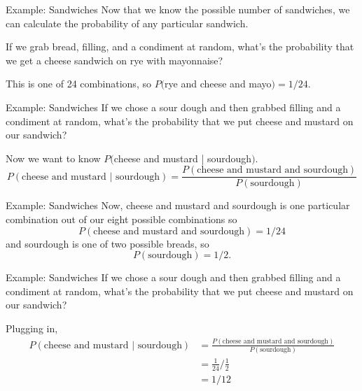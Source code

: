 \begin{frame}{Example: Sandwiches}
    Now that we know the possible number of sandwiches, we can calculate the probability of any particular sandwich.
    
    \vspace{12pt}If we grab bread, filling, and a condiment at random, what's the probability that we get a cheese sandwich on rye with mayonnaise?
    
    \vspace{12pt}This is one of 24 combinations, so $P($rye and cheese and mayo$)=1/24$.
\end{frame}

\begin{frame}{Example: Sandwiches}
    If we chose a sour dough and then grabbed filling and a condiment at random, what's the probability that we put cheese and mustard on our sandwich?
    
    \vspace{12pt}Now we want to know $P($cheese and mustard | sourdough$)$.
    \small\[
        P(\text{cheese and mustard }|\text{ sourdough}) = \frac{P(\text{cheese and mustard and sourdough})}{P(\text{sourdough})}
    \]
\end{frame}

\begin{frame}{Example: Sandwiches}
    Now, cheese and mustard and sourdough is one particular combination out of our eight possible combinations so
    \[
        P(\text{cheese and mustard and sourdough}) = 1/24
    \]
    and sourdough is one of two possible breads, so 
    \[
        P(\text{sourdough}) = 1/2.
    \]
\end{frame}

\begin{frame}{Example: Sandwiches}
    If we chose a sour dough and then grabbed filling and a condiment at random, what's the probability that we put cheese and mustard on our sandwich?
    
    \vspace{12pt}Plugging in,
    \small\begin{align*}
        P(\text{cheese and mustard }|\text{ sourdough}) &= \frac{P(\text{cheese and mustard and sourdough})}{P(\text{sourdough})} \\
        &= \frac{1}{24}\bigg/\frac{1}{2} \\
        &= 1/12
    \end{align*}
\end{frame}


